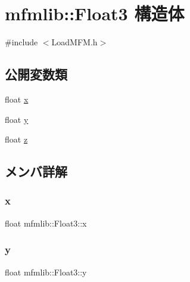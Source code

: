 \hypertarget{structmfmlib_1_1_float3}{}\section{mfmlib\+:\+:Float3 構造体}
\label{structmfmlib_1_1_float3}


{\ttfamily \#include $<$Load\+M\+F\+M.\+h$>$}

\subsection*{公開変数類}
\begin{DoxyCompactItemize}
\item 
float \mbox{\hyperlink{structmfmlib_1_1_float3_a5880c2d55a08df637466393a2d32901b}{x}}
\item 
float \mbox{\hyperlink{structmfmlib_1_1_float3_a5dfb8a3bd9aba9ae2ed8dc6b8aae1c7f}{y}}
\item 
float \mbox{\hyperlink{structmfmlib_1_1_float3_a9ade46ae48697f268fc476c753c5db59}{z}}
\end{DoxyCompactItemize}


\subsection{メンバ詳解}
\mbox{\label{structmfmlib_1_1_float3_a5880c2d55a08df637466393a2d32901b}} 
\subsubsection{\texorpdfstring{x}{x}}
{\footnotesize\ttfamily float mfmlib\+::\+Float3\+::x}

\mbox{\label{structmfmlib_1_1_float3_a5dfb8a3bd9aba9ae2ed8dc6b8aae1c7f}} 
\subsubsection{\texorpdfstring{y}{y}}
{\footnotesize\ttfamily float mfmlib\+::\+Float3\+::y}

\mbox{\label{structmfmlib_1_1_float3_a9ade46ae48697f268fc476c753c5db59}} 
